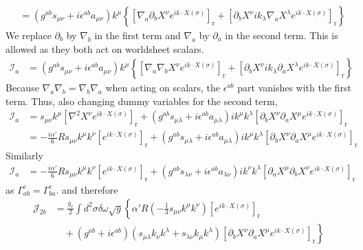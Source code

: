 \begin{tcolorbox}[breakable]
\begin{align}
			&= \left(g^{a b} s_{\mu \nu}+i \epsilon^{a b} a_{\mu \nu}\right) k^\mu\left\{\left[\nabla_a \partial_b X^\nu e^{i k \cdot X(\sigma)}\right]_{\mathrm{r}} + \left[\partial_b X^\nu i k_\lambda \nabla_a X^\lambda e^{i k \cdot X(\sigma)}\right]_{\mathrm{r}}\right\}
		\end{align}
		We replace $\partial_b$ by $\nabla_b$ in the first term and $\nabla_a$ by $\partial_a$ in the second term. This is allowed as they both act on worldsheet scalars.
		\begin{align}
			\mathcal{I}_a &= \left(g^{a b} s_{\mu \nu}+i \epsilon^{a b} a_{\mu \nu}\right) k^\mu\left\{\left[\nabla_a \nabla_b X^\nu e^{i k \cdot X(\sigma)}\right]_{\mathrm{r}} + \left[\partial_b X^\nu i k_\lambda \partial_a X^\lambda e^{i k \cdot X(\sigma)}\right]_{\mathrm{r}}\right\}
		\end{align}
		Because $\nabla_a \nabla_b = \nabla_b \nabla_a$ when acting on scalars, the $\epsilon^{a b}$ part vanishes with the first term. Thus, also changing dummy variables for the second term,
		\begin{align}
			\mathcal{I}_a &= s_{\mu \nu} k^\mu\left[\nabla^2 X^\nu e^{i k \cdot X(\sigma)}\right]_{\mathrm{r}} + \left(g^{a b} s_{\mu \lambda}+i \epsilon^{a b} a_{\mu \lambda}\right) i k^\mu k^\lambda\left[\partial_b X^\nu \partial_a X^\mu e^{i k \cdot X(\sigma)}\right]_{\mathrm{r}} \nonumber \\
			&= -\frac{i \alpha'}{6} R s_{\mu \nu} k^\mu k^\nu\left[e^{i k \cdot X(\sigma)}\right]_{\mathrm{r}} + \left(g^{a b} s_{\mu \lambda}+i \epsilon^{a b} a_{\mu \lambda}\right) i k^\mu k^\lambda\left[\partial_b X^\nu \partial_a X^\mu e^{i k \cdot X(\sigma)}\right]_{\mathrm{r}}
		\end{align}
		Similarly
		\begin{align}
			\mathcal{I}_a &= -\frac{i \alpha'}{6} R s_{\mu \nu} k^\mu k^\nu\left[e^{i k \cdot X(\sigma)}\right]_{\mathrm{r}} + \left(g^{a b} s_{\lambda \nu}+i \epsilon^{a b} a_{\lambda \nu}\right) i k^\nu k^\lambda\left[\partial_a X^\mu \partial_b X^\nu e^{i k \cdot X(\sigma)}\right]_{\mathrm{r}}
		\end{align}
		as $\Gamma_{a b}^c = \Gamma_{b a}^c$. and therefore
		\begin{align}
			\mathcal{J}_{2 b} &= \frac{g_c}{2} \int d^2 \sigma \delta \omega \sqrt{g}\left\{\alpha' R\left(-\frac{1}{3} s_{\mu \nu} k^\mu k^\nu\right)\left[e^{i k \cdot X(\sigma)}\right]_{\mathrm{r}}\right. \nonumber \\
			&\quad + \left.\left(g^{a b}+i \epsilon^{a b}\right)\left(s_{\mu \lambda} k_\nu k^\lambda + s_{\lambda \nu} k_\mu k^\lambda\right)\left[\partial_b X^\nu \partial_a X^\mu e^{i k \cdot X(\sigma)}\right]_{\mathrm{r}}\right\}

\end{align}
\end{tcolorbox}
